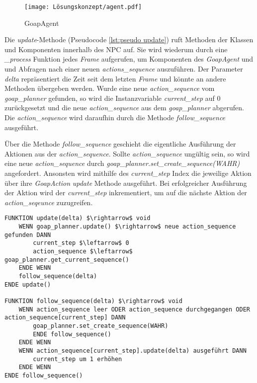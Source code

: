 \begin{figure}[h]
  \centering
  \texttt{[image: Lösungskonzept/agent.pdf]}
	\captionsetup{justification=justified, format=plain}
  \caption{GoapAgent}
  \label{fig:GoapAgent}
\end{figure}

Die \textit{update}-Methode (Pseudocode \ref{lst:pseudo update}) ruft Methoden der Klassen und Komponenten innerhalb des NPC auf. Sie wird wiederum durch eine \textit{\_process} Funktion jedes \textit{Frame} aufgerufen, um Komponenten des \textit{GoapAgent} und und Abfragen nach einer neuen \textit{actions\_sequence} auszuführen. Der Parameter \textit{delta} repräsentiert die Zeit seit dem letzten \textit{Frame} und könnte an andere Methoden übergeben werden. Wurde eine neue \textit{action\_sequence} vom \textit{goap\_planner} gefunden, so wird die Instanzvariable \textit{current\_step} auf $0$ zurückgesetzt und die neue \textit{action\_sequence} aus dem \textit{goap\_planner} abgerufen. Die \textit{action\_sequence} wird daraufhin durch die Methode \textit{follow\_sequence} ausgeführt.

\"{U}ber die Methode \textit{follow\_sequence} geschieht die eigentliche Ausführung der Aktionen aus der \textit{action\_sequence}. Sollte \textit{action\_sequence} ungültig sein, so wird eine neue \textit{action\_sequence} durch \textit{goap\_planner.set\_create\_sequence(WAHR)} angefordert. Ansonsten wird mithilfe des \textit{current\_step} Index die jeweilige Aktion über ihre \textit{GoapAction} \textit{update} Methode ausgeführt. Bei erfolgreicher Ausführung der Aktion wird der \textit{current\_step} inkrementiert, um auf die nächste Aktion der \textit{action\_seqeunce} zuzugreifen.


\begin{lstlisting}[language=Pseudo, caption={update Methode des GoapAgent}, mathescape=true, label={lst:pseudo update}]
FUNKTION update(delta) $\rightarrow$ void
    WENN goap_planner.update() $\rightarrow$ neue action_sequence gefunden DANN
        current_step $\leftarrow$ 0
        action_sequence $\leftarrow$ goap_planner.get_current_sequence()
    ENDE WENN
    follow_sequence(delta)
ENDE update()

FUNKTION follow_sequence(delta) $\rightarrow$ void
	WENN action_sequence leer ODER action_sequence durchgegangen ODER action_sequence[current_step] DANN
		goap_planner.set_create_sequence(WAHR)
		ENDE follow_sequence()
	ENDE WENN
	WENN action_sequence[current_step].update(delta) ausgeführt DANN
		current_step um 1 erhöhen
	ENDE WENN
ENDE follow_sequence()
\end{lstlisting}














